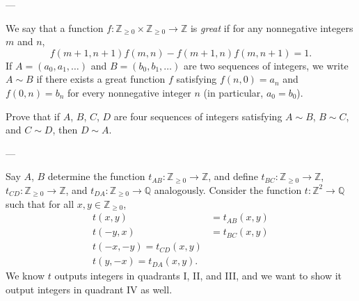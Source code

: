 
---

We say that a function $f:\mathbb Z_{\ge0}\times\mathbb Z_{\ge0}\to\mathbb Z$ is \emph{great} if for any nonnegative integers $m$ and $n$, \[f(m+1,n+1)f(m,n)-f(m+1,n)f(m,n+1)=1.\]
If $A=(a_0,a_1,\ldots)$ and $B=(b_0,b_1,\ldots)$ are two sequences of integers, we write $A\sim B$ if there exists a great function $f$ satisfying $f(n,0)=a_n$ and $f(0,n)=b_n$ for every nonnegative integer $n$ (in particular, $a_0=b_0$).

Prove that if $A$, $B$, $C$, $D$ are four sequences of integers satisfying $A\sim B$, $B\sim C$, and $C\sim D$, then $D\sim A$.

---

Say $A$, $B$ determine the function $t_{AB}:\mathbb Z_{\ge0}\to\mathbb Z$, and define $t_{BC}:\mathbb Z_{\ge0}\to\mathbb Z$, $t_{CD}:\mathbb Z_{\ge0}\to\mathbb Z$, and $t_{DA}:\mathbb Z_{\ge0}\to\mathbb Q$ analogously. Consider the function $t:\mathbb Z^2\to\mathbb Q$ such that for all $x,y\in\mathbb Z_{\ge0}$,
\begin{align*}
    t(x,y)&=t_{AB}(x,y)\\
    t(-y,x)&=t_{BC}(x,y)\\
    t(-x,-y)=t_{CD}(x,y)\\
    t(y,-x)=t_{DA}(x,y).
\end{align*}
We know $t$ outputs integers in quadrants I, II, and III, and we want to show it output integers in quadrant IV as well.

